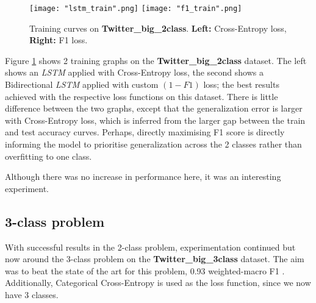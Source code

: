 \documentclass[12pt,a4paper]{article}
\begin{document}
\begin{figure}[H]
	\centering
	\texttt{[image: "lstm\_train".png]} \hfill
	\texttt{[image: "f1\_train".png]}\hfill
	
	\caption{Training curves on \textbf{Twitter\_big\_2class}. \textbf{Left:} Cross-Entropy loss, \textbf{Right:} F1 loss.}
	\label{train:train2}
\end{figure}

Figure \ref{train:train2} shows 2 training graphs on the \textbf{Twitter\_big\_2class} dataset. The left shows an \textit{LSTM} applied with Cross-Entropy loss, the second shows a Bidirectional \textit{LSTM} applied with custom $(1-F1)$ loss; the best results achieved with the respective loss functions on this dataset. There is little difference between the two graphs, except that the generalization error is larger with Cross-Entropy loss, which is inferred from the larger gap between the train and test accuracy curves. Perhaps, directly maximising F1 score is directly informing the model to prioritise generalization across the 2 classes rather than overfitting to one class.

Although there was no increase in performance here, it was an interesting experiment.

\subsection{3-class problem}

With successful results in the 2-class problem, experimentation continued but now around the 3-class problem on the \textbf{Twitter\_big\_3class} dataset. The aim was to beat the state of the art for this problem, 0.93 weighted-macro F1 \cite{Badjatiya}. Additionally, Categorical Cross-Entropy is used as the loss function, since we now have 3 classes.
\end{document}
